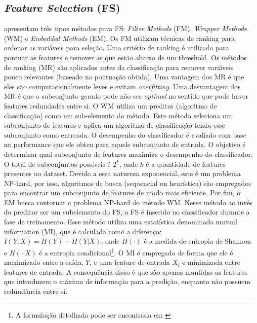 \documentclass{paper}
\begin{document}
\subsection{{\itshape Feature Selection} (FS)}
\citet{Chandrashekar2014} apresentam três tipos métodos para FS: \textit{Filter
  Methods} (FM), \textit{Wrapper Methods} (WM) e \textit{Embedded Methods} (EM).
Os FM utilizam técnicas de ranking para ordenar as variáveis para seleção.  Uma
critério de ranking é utilizado para pontuar as features e remover as que estão
abaixo de um threshold. Os métodos de ranking (MR) são aplicados antes da
classificação para remover variáveis pouco relevantes (baseado na pontuação
obtida). Uma vantagem dos MR é que eles são computacionalmente leves e evitam
\textit{overfitting}. Uma desvantagem dos MR é que o subconjunto gerado pode não
ser \textit{optimal} no sentido que pode haver features redundades entre si.  O
WM utiliza um preditor (algoritmo de classificação) como um sub-elemento do
método.  Este método seleciona um subconjunto de features e aplica um algoritmo
de classificação tendo esse subconjunto como entreada. O desempenho do
classificador é avaliado com base na performance que ele obteu para aquele
subconjunto de entrada. O objetivo é determinar qual subconjunto de features
maximiza o desempenho do classificador.  O total de subconjuntos possíveis é
$2^k$, onde $k$ é a quantidade de features presentes no dataset. Devido a essa
natureza exponencial, este é um problema NP-hard, por isso, algoritmos de busca
(sequencial ou heurística) são empregados para encontrar um subconjunto de
features de modo mais eficiente.  Por fim, o EM busca contornar o problema
NP-hard do método WM. Nesse método ao invés do preditor ser um subelemento do
FS, o FS é inserido no classificador durante a fase de treinamento. Esse método
utiliza uma estatística denominada mutual information (MI), que é calculada como
a diferença: $I(Y, X) = H(Y) - H(Y | X)$, onde $H(\cdot)$ é a medida de entropia
de Shannon e $H(\cdot| X)$ é a entropia condicional\footnote{A formulação
detalhada pode ser encontrada em \cite{Chandrashekar2014}}. O MI é empregado de
forma que ele é maximizado entre a saída, $Y$, e uma feature de entrada $X_i$ e
mínimizada entre features de entrada. A consequência disso é que são apenas
mantidas as features que introduzem o máximo de informação para a predição,
enquanto não possuem redundância entre si.

\end{document}
